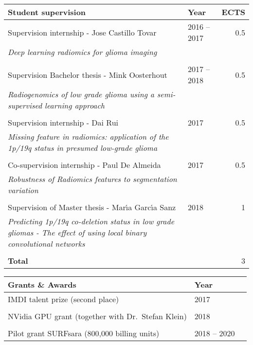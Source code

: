 \vspace*{0.5cm}
\begin{tabular}{L{8cm}lr}
    \textbf{Student supervision}&\textbf{Year}&\textbf{ECTS}\\
    \toprule
    Supervision internship - Jose Castillo Tovar & 2016 -- 2017 & 0.5 \\
    \textit{Deep learning radiomics for glioma imaging}\\
    \\
    Supervision Bachelor thesis - Mink Oosterhout & 2017 -- 2018 & 0.5 \\
    \textit{Radiogenomics of low grade glioma using a semi-supervised learning approach}\\
    \\
    Supervision internship - Dai Rui & 2017 & 0.5 \\
    \textit{Missing feature in radiomics: application of the 1p/19q status in presumed low-grade glioma}\\
    \\
    Co-supervision internship - Paul De Almeida & 2017 & 0.5\\
    \textit{Robustness of Radiomics features to segmentation variation}\\
    \\
    Supervision of Master thesis - Mar{\'\i}a Garc{\'\i}a Sanz & 2018 & 1\\
    \textit{Predicting 1p/19q co-deletion status in low grade gliomas - The effect of using local binary convolutional networks}\\
    \\
    \textbf{Total} & & 3\\
\end{tabular}


\newpage
\begin{tabular}{L{8cm}lr}
    \textbf{Grants \& Awards}&\textbf{Year}\\
    \toprule
    IMDI talent prize (second place) & 2017\\
    \\
    NVidia GPU grant (together with Dr.~Stefan Klein) & 2018\\
    \\
    Pilot grant SURFsara (800,000 billing units) & 2018 -- 2020\\
\end{tabular}

